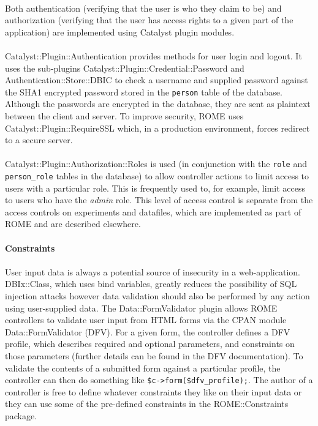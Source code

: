 \paragraph{}
Both authentication (verifying that the user is who they claim to be) and authorization (verifying that the user has access rights to a given part of the application) are implemented using Catalyst plugin modules. 

\paragraph{}
Catalyst::Plugin::Authentication provides methods for user login and logout. It uses the sub-plugins Catalyst::Plugin::Credential::Password and Authentication::Store::DBIC to check a username and supplied password against the SHA1 encrypted password stored in the \texttt{person} table of the database. Although the passwords are encrypted in the database, they are sent as plaintext between the client and server. To improve security, ROME uses Catalyst::Plugin::RequireSSL which, in a production environment, forces redirect to a secure server.

\paragraph{}
Catalyst::Plugin::Authorization::Roles is used (in conjunction with the \texttt{role} and \texttt{person\_role} tables in the database) to allow controller actions to limit access to users with a particular role. This is frequently used to, for example, limit access to users who have the \textit{admin} role. This level of access control is separate from the access controls on experiments and datafiles, which are implemented as part of ROME and are described elsewhere.


\paragraph{Constraints}

\paragraph{}
User input data is always a potential source of insecurity in a web-application. DBIx::Class, which uses bind variables, greatly reduces the possibility of SQL injection attacks however data validation should also be performed by any action using user-supplied data. The Data::FormValidator plugin allows ROME controllers to validate user input from HTML forms via the CPAN module Data::FormValidator (DFV). For a given form, the controller defines a DFV profile, which describes required and optional parameters, and constraints on those parameters (further details can be found in the DFV documentation). To validate the contents of a submitted form against a particular profile, the controller can then do something like \verb|$c->form($dfv_profile);|. The author of a controller is free to define whatever constraints they like on their input data or they can use some of the pre-defined constraints in the ROME::Constraints package.

